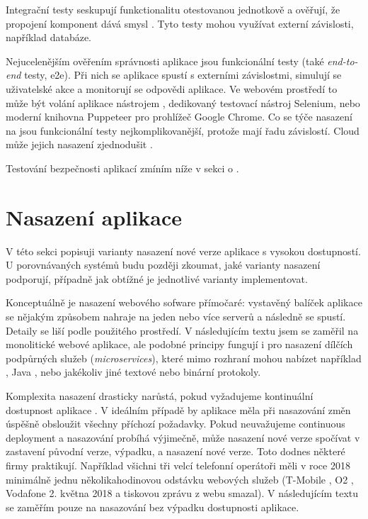         Integrační testy seskupují funkctionalitu otestovanou jednotkově a ověřují, že propojení komponent dává smysl \cite{integration-tests}. Tyto testy mohou využívat externí závislosti, například databáze.

        Nejucelenějším ověřením správnosti aplikace jsou funkcionální testy (také \textit{end-to-end} testy, e2e). Při nich se aplikace spustí s externími závislostmi, simulují se uživatelské akce a monitorují se odpovědi aplikace. Ve webovém prostředí to může být volání aplikace nástrojem , dedikovaný testovací nástroj Selenium, nebo moderní knihovna Puppeteer pro prohlížeč Google Chrome. Co se týče nasazení na \CI jsou funkcionální testy nejkomplikovanější, protože mají řadu závislostí. Cloud může jejich nasazení zjednodušit \cite{gcp-headless}.


        Testování bezpečnosti aplikací zmíním níže v sekci o .

    \section{Nasazení aplikace}
        V této sekci popisuji varianty nasazení nové verze aplikace s vysokou dostupností. U porovnávaných \CICD systémů budu později zkoumat, jaké varianty nasazení podporují, případně jak obtížné je jednotlivé varianty implementovat.

        Konceptuálně je nasazení webového sofware přímočaré: vystavěný balíček aplikace se nějakým způsobem nahraje na jeden nebo více serverů a následně se spustí. Detaily se liší podle použitého prostředí. V následujícím textu jsem se zaměřil na monolitické webové aplikace, ale podobné principy fungují i pro nasazení dílčích podpůrných služeb (\textit{microservices}), které mimo \HTTP rozhraní mohou nabízet například , Java , nebo jakékoliv jiné textové nebo binární protokoly.

        Komplexita nasazení drasticky narůstá, pokud vyžadujeme kontinuální dostupnost aplikace \cite{beyer2016site}. V ideálním případě by aplikace měla při nasazování změn úspěšně obsloužit všechny příchozí požadavky. Pokud neuvažujeme continuous deployment a nasazování probíhá výjimečně, může nasazení nové verze spočívat v zastavení původní verze, výpadku, a nasazení nové verze. Toto dodnes některé firmy praktikují. Například všichni tři velcí telefonní operátoři měli v roce 2018 minimálně jednu několikahodinovou odstávku webových služeb (T-Mobile \cite{tmobile-odstavka}, O2 \cite{o2-odstavka}, Vodafone 2. května 2018 a tiskovou zprávu z webu smazal). V následujícím textu se zaměřím pouze na nasazování bez výpadku dostupnosti aplikace.

